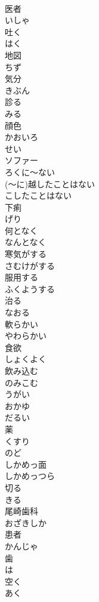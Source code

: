 \documentclass[8pt]{extreport}
\begin{document}
\begin{CJK}{UTF8}{min}
\\	医者	
\\	いしゃ
\\	吐く	
\\	はく
\\	地図	
\\	ちず
\\	気分	
\\	きぶん
\\	診る	
\\	みる
\\	顔色	
\\	かおいろ
\\	せい	
\\	ソファー	
\\	ろくに～ない	
\\	(～に)越したことはない	
\\	こしたことはない
\\	下痢	
\\	げり
\\	何となく	
\\	なんとなく
\\	寒気がする	
\\	さむけがする
\\	服用する	
\\	ふくようする
\\	治る	
\\	なおる
\\	軟らかい	
\\	やわらかい
\\	食欲	
\\	しょくよく
\\	飲み込む	
\\	のみこむ
\\	うがい	
\\	おかゆ	
\\	だるい	
\\	薬	
\\	くすり
\\	のど	
\\	しかめっ面	
\\	しかめっつら
\\	切る	
\\	きる
\\	尾崎歯科	
\\	おざきしか
\\	患者	
\\	かんじゃ
\\	歯	
\\	は
\\	空く	
\\	あく

\end{CJK}
\end{document}
